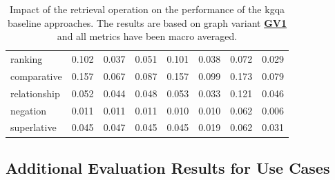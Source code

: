 \begin{table}[H]
{\begin{tabular}{@{}llllllll@{}}
ranking & 0.102 & 0.037 & 0.051 & 0.101 & 0.038 & 0.072 & 0.029 \\
comparative & 0.157 & 0.067 & 0.087 & 0.157 & 0.099 & 0.173 & 0.079 \\
relationship & 0.052 & 0.044 & 0.048 & 0.053 & 0.033 & 0.121 & 0.046 \\
negation & 0.011 & 0.011 & 0.011 & 0.010 & 0.010 & 0.062 & 0.006 \\
superlative & 0.045 & 0.047 & 0.045 & 0.045 & 0.019 & 0.062 & 0.031 \\
\bottomrule
\end{tabular}%
}
\caption[Baseline Performance by Operation Complexity]{Impact of the retrieval operation on the performance of the \gls{kgqa} baseline approaches. The results are based on graph variant \hyperref[enum:gv1]{\textbf{GV1}} and all metrics have been macro averaged.}
\label{tab:baseline_performance_operation_complexity}
\end{table}

\subsection{Additional Evaluation Results for Use Cases}
\label{sec:appendix:additional_evaluation_results_use_cases}

